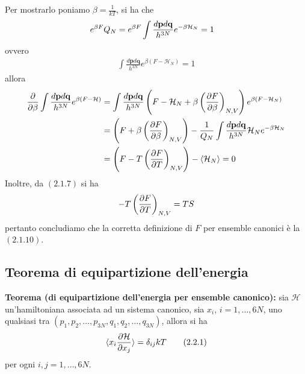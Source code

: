 \documentclass{article}
\begin{document}
Per mostrarlo poniamo $\beta = \frac{1}{kT}$, si ha che 
\begin{align}
    e^{\beta F}Q_N &= e^{\beta F}\int\frac{d\mathbf{p}d\mathbf{q}}{h^{3N}}e^{-\beta\mathcal{H}_N} = 1 \notag
\end{align}
ovvero 
\begin{align}
    \int\frac{d\mathbf{p}d\mathbf{q}}{h^{3N}}e^{\beta(F - \mathcal{H}_N)} = 1 \tag{2.1.11}
\end{align}
allora 
\begin{align}
    \frac{\partial}{\partial \beta}\int\frac{d\mathbf{p}d\mathbf{q}}{h^{3N}}e^{\beta(F - \mathcal{H})} &= \int\frac{d\mathbf{p}d\mathbf{q}}{h^{3N}}\left(F - \mathcal{H}_N + \beta\left(\frac{\partial F}{\partial \beta}\right)_{N, V}\right)e^{\beta(F - \mathcal{H}_N)} \notag \\
    &= \left(F + \beta\left(\frac{\partial F}{\partial \beta}\right)_{N, V}\right) - \frac{1}{Q_N}\int\frac{d\mathbf{p}d\mathbf{q}}{h^{3N}}\mathcal{H}_Ne^{-\beta\mathcal{H}_N} \notag \\
    &= \left(F - T\left(\frac{\partial F}{\partial T}\right)_{N, V}\right) - \braket{\mathcal{H}_N} = 0 \notag
\end{align}
Inoltre, da $(2.1.7)$ si ha
\begin{align}
    -T\left(\frac{\partial F}{\partial T}\right)_{N, V} = TS \notag 
\end{align}
pertanto concludiamo che la corretta definizione di $F$ per ensemble canonici è la $(2.1.10)$.

\newpage
\subsection{Teorema di equipartizione dell'energia}
\textbf{Teorema (di equipartizione dell'energia per ensemble canonico):} sia $\mathcal{H}$ un'hamiltoniana associata ad un sistema canonico, sia $x_i$, $i = 1, \dots, 6N$, uno qualsiasi tra $(p_1, p_2, \dots, p_{3N}, q_1, q_2, \dots, q_{3N})$, allora si ha 
\begin{align}
    \braket{x_i\frac{\partial\mathcal{H}}{\partial x_j}} = \delta_{ij}kT \tag{2.2.1}
\end{align}
per ogni $i, j = 1, \dots, 6N$. \\
\end{document}
